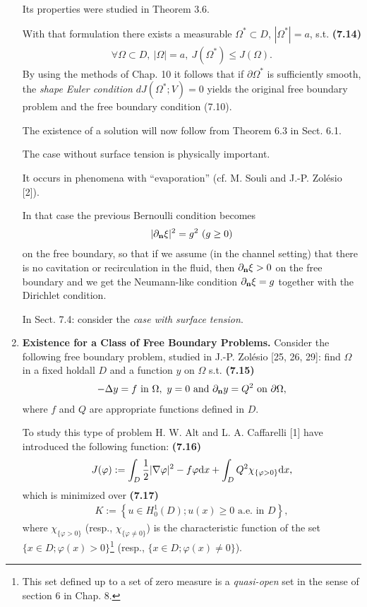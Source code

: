 \documentclass{book}
\numberwithin{equation}{section}
\begin{document}
\begin{enumerate}
    Its properties were studied in Theorem 3.6.
    
    With that formulation there exists a measurable $\Omega^*\subset D$, $|\Omega^*| = a$, s.t. \textbf{(7.14)}
    \begin{align*}
        \forall\Omega\subset D,\ |\Omega| = a,\ J(\Omega^*)\le J(\Omega).
    \end{align*}
    By using the methods of Chap. 10 it follows that if $\partial\Omega^*$ is sufficiently smooth, the \textit{shape Euler condition} $dJ(\Omega^*;V) = 0$ yields the original free boundary problem and the free boundary condition (7.10).
    
    The existence of a solution will now follow from Theorem 6.3 in Sect. 6.1.
    
    The case without surface tension is physically important.
    
    It occurs in phenomena with ``evaporation'' (cf. M. Souli and J.-P. Zolésio [2]).
    
    In that case the previous Bernoulli condition becomes
    \begin{align*}
        |\partial_{\bf n}\xi|^2 = g^2\ (g\ge 0)
    \end{align*}
    on the free boundary, so that if we assume (in the channel setting) that there is no cavitation or recirculation in the fluid, then $\partial_{\bf n}\xi > 0$ on the free boundary and we get the Neumann-like condition $\partial_{\bf n}\xi = g$ together with the Dirichlet condition.
    
    In Sect. 7.4: consider the \textit{case with surface tension}.
    \item \textbf{Existence for a Class of Free Boundary Problems.} Consider the following free boundary problem, studied in J.-P. Zolésio [25, 26, 29]: find $\Omega$ in a fixed holdall $D$ and a function $y$ on $\Omega$ s.t. \textbf{(7.15)}
    \begin{align*}
        -\Delta y = f \mbox{ in } \Omega,\ y = 0 \mbox{ and } \partial_{\bf n}y = Q^2 \mbox{ on } \partial\Omega,
    \end{align*}
    where $f$ and $Q$ are appropriate functions defined in $D$.
    
    To study this type of problem H. W. Alt and L. A. Caffarelli [1] have introduced the following function: \textbf{(7.16)}
    \begin{align*}
        J(\varphi) := \int_D \frac{1}{2}|\nabla\varphi|^2 - f\varphi{\rm d}x + \int_D Q^2\chi_{\{\varphi > 0\}}{\rm d}x,
    \end{align*}
    which is minimized over \textbf{(7.17)}
    \begin{align*}
        K := \left\{u\in H_0^1(D);u(x)\ge 0 \mbox{ a.e. in } D\right\},
    \end{align*}
    where $\chi_{\{\varphi > 0\}}$ (resp., $\chi_{\{\varphi\ne 0\}}$) is the characteristic function of the set $\{x\in D;\varphi(x) > 0\}$\footnote{This set defined up to a set of zero measure is a \textit{quasi-open} set in the sense of section 6 in Chap. 8.} (resp., $\{x\in D;\varphi(x)\ne 0\}$).
    

\end{enumerate}
\end{document}
